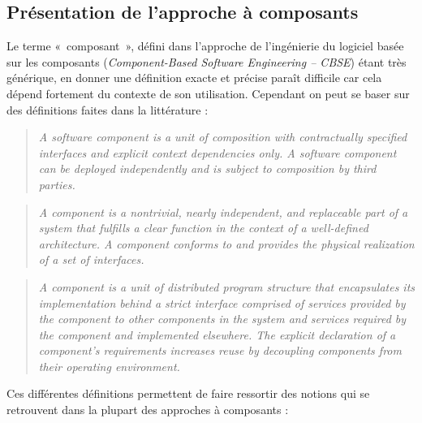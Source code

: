 \subsection{Présentation de l'approche à composants}
    
Le terme «~composant~», défini dans l'approche de l'ingénierie du logiciel basée sur les composants (\emph{Component-Based Software Engineering -- CBSE}) étant très générique, en donner une définition exacte et précise paraît difficile car cela dépend fortement du contexte de son utilisation. Cependant on peut se baser sur des définitions faites dans la littérature :

\begin{quote}
  \emph{ A software component is a unit of composition with contractually specified interfaces and explicit context dependencies only. A software component can be deployed independently and is subject to composition by third parties.} \cite{Szyperski:2002:CSB:515228}
\end{quote}
  
\begin{quote}
  \emph{ A component is a nontrivial, nearly independent, and replaceable part of a system that fulfills a clear function in the context of a well-defined architecture. A component conforms to and provides the physical realization of a set of interfaces.} \cite{kruchten1998modeling}
\end{quote}
  
\begin{quote}
  \emph{ A component is a unit of distributed program structure that encapsulates its implementation behind a strict interface comprised of services provided by the component to other components in the system and services required by the component and implemented elsewhere. The explicit declaration of a component's requirements increases reuse by decoupling components from their operating environment.} \cite{DBLP:conf/cds/PryceC98}
\end{quote}
  
Ces différentes définitions permettent de faire ressortir des notions qui se retrouvent dans la plupart des approches à composants : 
    
